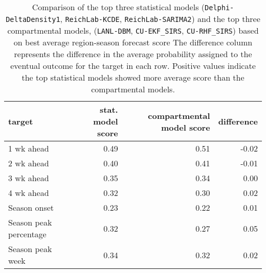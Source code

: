 \begin{table}[ht]
\centering
\begin{tabular}{lrrr}
  \hline
target & stat. model score & compartmental model score & difference \\ 
  \hline
1 wk ahead & 0.49 & 0.51 & -0.02 \\ 
  2 wk ahead & 0.40 & 0.41 & -0.01 \\ 
  3 wk ahead & 0.35 & 0.34 & 0.00 \\ 
  4 wk ahead & 0.32 & 0.30 & 0.02 \\ 
  Season onset & 0.23 & 0.22 & 0.01 \\ 
  Season peak percentage & 0.32 & 0.27 & 0.05 \\ 
  Season peak week & 0.34 & 0.32 & 0.02 \\ 
   \hline
\end{tabular}
\caption{Comparison of the top three statistical models ({\tt Delphi-DeltaDensity1}, {\tt ReichLab-KCDE}, {\tt ReichLab-SARIMA2}) and the top three compartmental models, ({\tt LANL-DBM}, {\tt CU-EKF\_SIRS}, {\tt CU-RHF\_SIRS}) based on best average region-season forecast score The difference column represents the difference in the average probability assigned to the eventual outcome for the target in each row. Positive values indicate the top statistical models showed more average score than the compartmental models.} 
\label{tab:score-by-model-type}
\end{table}

